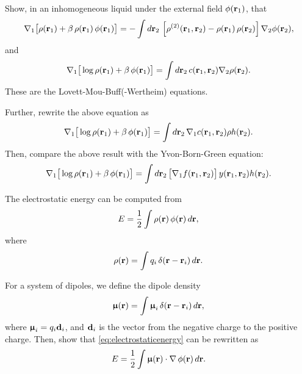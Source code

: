 \documentclass{book}
\begin{document}

Show, in an inhomogeneous liquid under the external field $\phi(\vr_1)$, that
%
\begin{align*}
  \nabla_1 \big[
    \rho(\vr_1)
  + \beta \, \rho(\vr_1) \, \phi(\vr_1)
\big]
  =
  -\int d \vr_2 \,
    \left[
      \rho^{(2)}(\vr_1, \vr_2) - \rho(\vr_1) \, \rho(\vr_2)
    \right]
    \nabla_2 \phi(\vr_2),
\end{align*}
%
and
%
\begin{align}
  \nabla_1 \big[
    \log \rho(\vr_1) + \beta \, \phi(\vr_1)
  \big]
   = \int d \vr_2 \,
    c(\vr_1, \vr_2)
    \nabla_2 \rho(\vr_2).
\end{align}
These are the Lovett-Mou-Buff(-Wertheim) equations\cite{lovett1976, wertheim1976}.




Further, rewrite the above equation as
%
\[
   \nabla_1
   \big[
     \log \rho(\vr_1) + \beta \, \phi(\vr_1)
   \big]
  =
 \int d \vr_2 \,
    \nabla_1 c(\vr_1, \vr_2)
    \rho h(\vr_2).
\]
%
Then, compare the above result with the Yvon-Born-Green equation:
%
\begin{align}
   \nabla_1
   \big[
     \log \rho(\vr_1) + \beta \, \phi(\vr_1)
   \big]
  =
 \int d \vr_2 \,
    \big[ \nabla_1 f(\vr_1, \vr_2) \big]
    \, y(\vr_1, \vr_2)
    h(\vr_2).
\end{align}





The electrostatic energy can be computed from
\begin{equation}
  E = \frac{1}{2} \int \rho(\vr) \, \phi(\vr) \, d\vr,
  \label{eq:electrostaticenergy}
\end{equation}
where
\[
  \rho(\vr) = \int q_i \, \delta(\vr - \vr_i) \, d\vr.
\]

For a system of dipoles, we define the dipole density
\[
  \vct\upmu(\vr) = \int \vct\upmu_i \, \delta(\vr - \vr_i) \, d\vr,
\]
where $\vct\upmu_i = q_i \vct{d}_i$,
and $\vct{d}_i$ is the vector from the negative charge to the positive charge.
%
Then, show that \eqref{eq:electrostaticenergy} can be rewritten as
\[
  E = \frac{1}{2} \int \vct\upmu(\vr) \cdot \nabla \, \phi(\vr) \, d\vr.
\]

\end{document}
